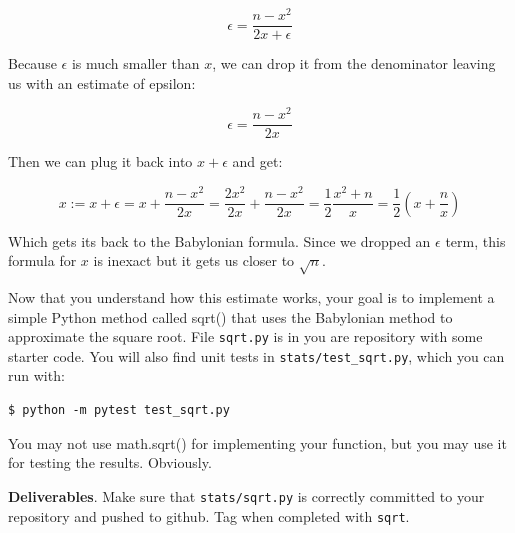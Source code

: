 \begin{fullwidth}
\[
\epsilon = \frac{n - x^2}{2x + \epsilon}
\]

Because $\epsilon$ is much smaller than $x$, we can drop it from the denominator leaving us with an estimate of epsilon:

\[
\epsilon = \frac{n - x^2}{2x}
\]

Then we can plug it back into $x + \epsilon$ and get:

\[
x := x + \epsilon = x + \frac{n - x^2}{2x} = \frac{2x^2}{2x} + \frac{n - x^2}{2x} = \frac{1}{2}\frac{x^2 + n}{x} = \frac{1}{2}(x + \frac{n}{x})
\]

Which gets its back to the Babylonian formula. Since we dropped an $\epsilon$ term, this formula for $x$ is inexact but it gets us closer to $\sqrt{n}$.


Now that you understand how this estimate works, your goal is to implement a simple Python method called sqrt() that uses the Babylonian method to approximate the square root. File {\tt sqrt.py} is in you are repository with some starter code. You will also find unit tests in {\tt stats/test\_sqrt.py}, which you can run with:

\begin{lstlisting}[style=BashInputStyle]
$ python -m pytest test_sqrt.py
\end{lstlisting}

\begin{callout}{\bctakecare}
You may not use math.sqrt() for implementing your function, but you may use it for testing the results.  Obviously.
\end{callout}

\begin{callout}{\bcplume}
{\bf Deliverables}. Make sure that {\tt stats/sqrt.py} is correctly committed to your repository and pushed to github. Tag when completed with {\tt sqrt}.
\end{callout}


\end{fullwidth}
